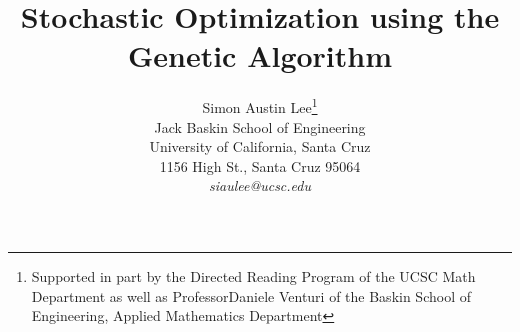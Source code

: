 \title{Stochastic Optimization using the Genetic Algorithm}

\author{ 
Simon Austin Lee\thanks{Supported in part 
by the Directed Reading Program of the UCSC Math Department as well as ProfessorDaniele Venturi of the Baskin School of Engineering, Applied Mathematics Department}\\
Jack Baskin School of Engineering \\
University of California, Santa Cruz\\
1156 High St., Santa Cruz 95064\\
\emph{siaulee@ucsc.edu}
}\date{}
\maketitle 
